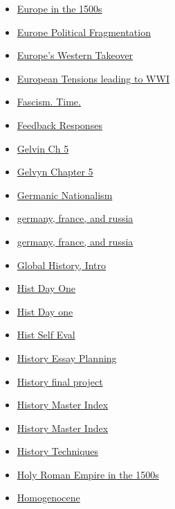 \documentclass[11pt]{article}
\begin{document}
\begin{itemize}
\begin{itemize}
\begin{itemize}
\item \href{history/history10/KBhHIST201Europe1500s.org}{Europe in the 1500s}
\item \href{history/history10/KBhHIST201PoliticalFragmentationofEurope.org}{Europe Political Fragmentation}
\item \href{history/history10/KBhHIST201EuropesWesternTakeover.org}{Europe's Western Takeover}
\item \href{history/history10/KBhHIST201WWIBeginning.org}{European Tensions leading to WWI}
\item \href{history/history10/KBxFascism.org}{Fascism. Time.}
\item \href{history/history10/KBxFeedbackResponses.org}{Feedback Responses}
\item \href{history/history10/KBe20hist201floGelvinCh5.org}{Gelvin Ch 5}
\item \href{history/history10/KBhHIST201GelvinChapter5.org}{Gelvyn Chapter 5}
\item \href{history/history10/KBhHIST201GermanicNationalism.org}{Germanic Nationalism}
\item \href{history/history10/KBe21hist201retWWICausesPowerStruggle.org}{germany, france, and russia}
\item \href{history/history10/KBe21hist201floWWICauses.org}{germany, france, and russia}
\item \href{history/history10/KBhHIST201GHIntro.org}{Global History, Intro}
\item \href{history/history10/KBxDayOne.org}{Hist Day One}
\item \href{history/history10/KB20200824141300.org}{Hist Day one}
\item \href{history/history10/KBxHistSelfEval2020.org}{Hist Self Eval}
\item \href{history/history10/KBhHIST201WWIEssayOutlineJack.org}{History Essay Planning}
\item \href{history/history10/KBe21hist201retFinalProject.org}{History final project}
\item \href{history/history10/index.org}{History Master Index}
\item \href{history/history10/KBHistoryMasterIndex.org}{History Master Index}
\item \href{history/history10/20hist201refTechniques.org}{History Techniques}
\item \href{history/history10/KBhHIST201HolyRomanEmpire1500s.org}{Holy Roman Empire in the 1500s}
\item \href{history/history10/KBhHIST201HomogenosceneLN.org}{Homogenocene}

\end{itemize}
\end{itemize}
\end{itemize}
\end{document}
